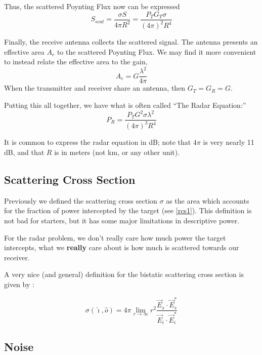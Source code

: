 Thus, the scattered Poynting Flux now can be expressed
\begin{equation}
S_{scat} = \frac{\sigma S}{4\pi R^2} =  \frac{P_T G_T \sigma}{(4\pi)^2 R^4}
\end{equation}

Finally, the receive antenna collects the scattered signal.  The
antenna presents an effective area $A_e$ to the scattered Poynting
Flux.  We may find it more convenient to instead relate the effective
area to the gain,
\begin{equation}
A_e = G \frac{\lambda^2}{4\pi}
\end{equation}
When the transmitter and receiver share an antenna, then $G_T = G_R =
G$.

Putting this all together, we have what is often called ``The Radar
Equation:''
\begin{equation} \label{e:radareq0}
P_R = \frac{P_T G^2 \sigma \lambda^2}{(4\pi)^3 R^4}
\end{equation}

It is common to express the radar equation in dB; note that $4\pi$ is
very nearly 11 dB, and that $R$ is in meters (not km, or any other
unit).

\subsection{Scattering Cross Section}

Previously we defined the scattering cross section $\sigma$ as the
area which accounts for the fraction of power intercepted by the
target (see \eqref{rcs1}).  This definition is not bad for starters,
but it has some major limitations in descriptive power.

For the radar problem, we don't really care how much power the target
intercepts, what we \textbf{really} care about is how much is
scattered towards our receiver.

A very nice (and general) definition for the bistatic scattering cross
section is given by \cite{tsang-kong-shin}:

\begin{equation}
\sigma(\hat\imath, \hat o) = 4\pi \lim_{r\rightarrow\infty} r^2 
\frac{\vec{E}_s\cdot\vec{E}_s^\ast}{\vec{E}_i\cdot\vec{E}_i^\ast}
\end{equation}


\subsection{Noise}

